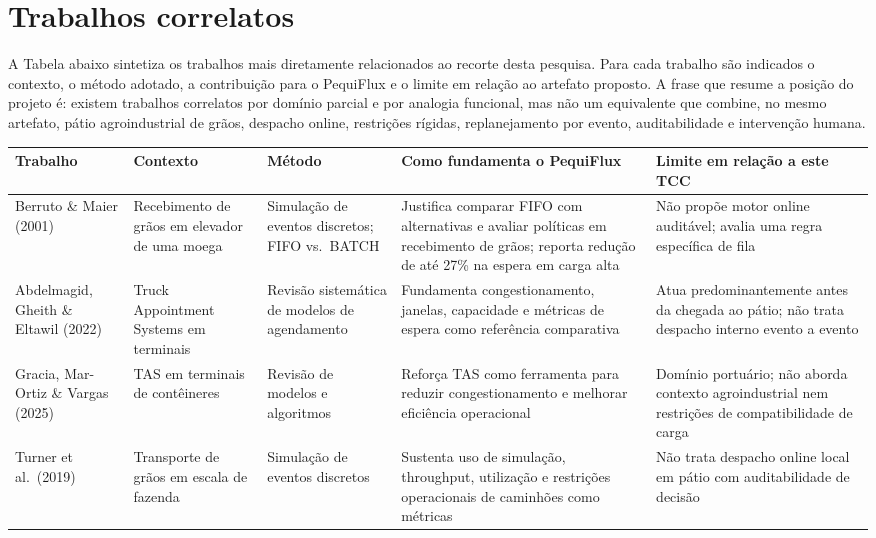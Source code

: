 \documentclass[
  12pt,
  oneside,
  a4paper,
  sumario=tradicional,
  brazil
]{abntex2}
\begin{document}
\section{Trabalhos correlatos}

A Tabela abaixo sintetiza os trabalhos mais diretamente relacionados ao recorte desta pesquisa. Para cada trabalho s\~ao indicados o contexto, o m\'etodo adotado, a contribui\c{c}\~ao para o PequiFlux e o limite em rela\c{c}\~ao ao artefato proposto. A frase que resume a posi\c{c}\~ao do projeto \'e: existem trabalhos correlatos por dom\'inio parcial e por analogia funcional, mas n\~ao um equivalente que combine, no mesmo artefato, p\'atio agroindustrial de gr\~aos, despacho online, restri\c{c}\~oes r\'igidas, replanejamento por evento, auditabilidade e interven\c{c}\~ao humana.

\begin{table}[H]
\centering
\footnotesize
\renewcommand{\arraystretch}{1.22}
\begin{tabularx}{\textwidth}{@{}P{0.16\textwidth}P{0.16\textwidth}P{0.17\textwidth}P{0.21\textwidth}Y@{}}
\toprule
\textbf{Trabalho} & \textbf{Contexto} & \textbf{M\'etodo} & \textbf{Como fundamenta o PequiFlux} & \textbf{Limite em rela\c{c}\~ao a este TCC} \\
\midrule
Berruto \& Maier (2001) & Recebimento de gr\~aos em elevador de uma moega & Simula\c{c}\~ao de eventos discretos; FIFO vs.\ BATCH & Justifica comparar FIFO com alternativas e avaliar pol\'iticas em recebimento de gr\~aos; reporta redu\c{c}\~ao de at\'e 27\% na espera em carga alta & N\~ao prop\~oe motor online audit\'avel; avalia uma regra espec\'ifica de fila \\
\addlinespace
Abdelmagid, Gheith \& Eltawil (2022) & Truck Appointment Systems em terminais & Revis\~ao sistem\'atica de modelos de agendamento & Fundamenta congestionamento, janelas, capacidade e m\'etricas de espera como refer\^encia comparativa & Atua predominantemente antes da chegada ao p\'atio; n\~ao trata despacho interno evento a evento \\
\addlinespace
Gracia, Mar-Ortiz \& Vargas (2025) & TAS em terminais de cont\^eineres & Revis\~ao de modelos e algoritmos & Refor\c{c}a TAS como ferramenta para reduzir congestionamento e melhorar efici\^encia operacional & Dom\'inio portu\'ario; n\~ao aborda contexto agroindustrial nem restri\c{c}\~oes de compatibilidade de carga \\
\addlinespace
Turner et al.\ (2019) & Transporte de gr\~aos em escala de fazenda & Simula\c{c}\~ao de eventos discretos & Sustenta uso de simula\c{c}\~ao, throughput, utiliza\c{c}\~ao e restri\c{c}\~oes operacionais de caminh\~oes como m\'etricas & N\~ao trata despacho online local em p\'atio com auditabilidade de decis\~ao \\

\end{tabularx}
\end{table}
\end{document}
